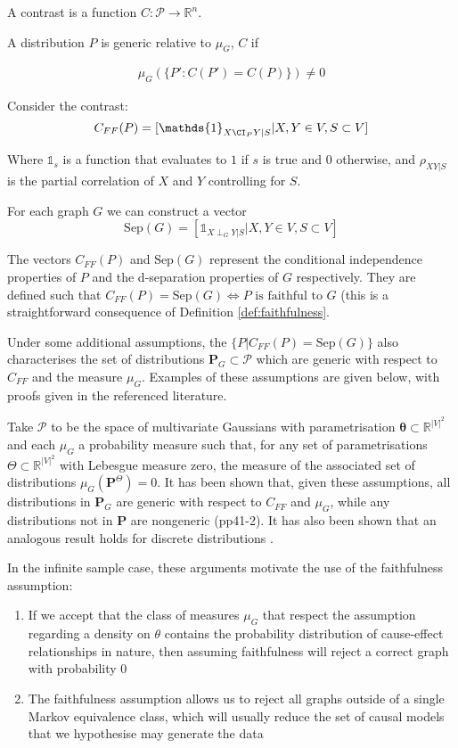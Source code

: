 A contrast is a function $C:\mathcal{P}\to\mathbb{R}^n$.

A distribution $P$ is generic relative to $\mu_G$, $C$ if

\begin{align*}
    \mu_G(\{P':C(P')=C(P)\}) \neq 0
\end{align*}

Consider the contrast:
\[C_{FF}(P) = [\mathds{1}_{X\CI_P Y|S}|X,Y\in V,S\subset V]\]

Where $\mathds{1}_s$ is a function that evaluates to $1$ if $s$ is true and $0$ otherwise, and $\rho_{XY|S}$ is the partial correlation of $X$ and $Y$ controlling for $S$.

For each graph $G$ we can construct a vector 
\[\text{Sep}(G) = [\mathds{1}_{X\perp_G Y|S}|X,Y\in V, S\subset V]\]

The vectors $C_{FF}(P)$ and $\text{Sep}(G)$ represent the conditional independence properties of $P$ and the d-separation properties of $G$ respectively. They are defined such that $C_{FF}(P)=\text{Sep}(G)\Leftrightarrow P\text{ is faithful to }G$ (this is a straightforward consequence of Definition \ref{def:faithfulness}.

Under some additional assumptions, the $\{P|C_{FF}(P)=\text{Sep}(G)\}$ also characterises the set of distributions $\mathbf{P}_G\subset \mathcal{P}$ which are generic with respect to $C_{FF}$ and the measure $\mu_G$. Examples of these assumptions are given below, with proofs given in the referenced literature.

Take $\mathcal{P}$ to be the space of multivariate Gaussians with parametrisation $\mathbf{\theta}\subset \mathbb{R}^{|V|^2}$ and each $\mu_G$ a probability measure such that, for any set of parametrisations $\Theta\subset \mathbb{R}^{|V|^2}$ with Lebesgue measure zero, the measure of the associated set of distributions $\mu_G(\mathbf{P}^\Theta)=0$. It has been shown that, given these assumptions, all distributions in $\mathbf{P}_G$ are generic with respect to $C_{FF}$ and $\mu_G$, while any distributions not in $\mathbf{P}$ are nongeneric \cite{spirtes_causation_1993} (pp41-2). It has also been shown that an analogous result holds for discrete distributions \cite{meek_strong_2013}.

In the infinite sample case, these arguments motivate the use of the faithfulness assumption:
\begin{enumerate}
    \item If we accept that the class of measures $\mu_G$ that respect the assumption regarding a density on $\theta$ contains the probability distribution of cause-effect relationships in nature, then assuming faithfulness will reject a correct graph with probability 0
    \item The faithfulness assumption allows us to reject all graphs outside of a single Markov equivalence class, which will usually reduce the set of causal models that we hypothesise may generate the data
\end{enumerate}

